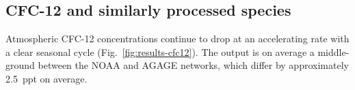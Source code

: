 \subsection{CFC-12 and similarly processed species}
\label{ssec:results-cfc12-like}

Atmospheric CFC-12 concentrations continue to drop at an accelerating rate
with a clear seasonal cycle (Fig.~\ref{fig:results-cfc12}).
The output is on average a middle-ground between the NOAA \citep{dutton_hats-cfc12_2022} and AGAGE \citep{prinn_ale-gage-agage_2000,prinn_agage_2018} networks,
which differ by approximately 2.5~ppt on average.
